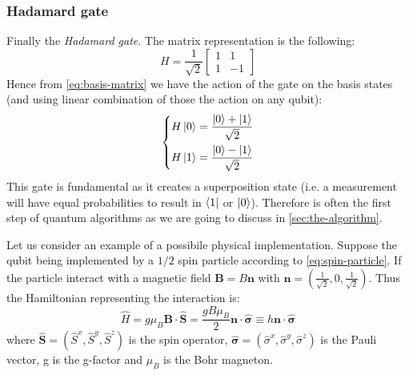 \subsubsection{Hadamard gate}
Finally the \emph{Hadamard gate}. The matrix representation is the following:
\begin{equation}\label{eq:hadamard-gate}
    H = \frac{1}{\sqrt{2}}
    \begin{bmatrix}
    1 & 1\\
    1 & -1
    \end{bmatrix}
\end{equation}
Hence from \ref{eq:basis-matrix} we have the action of the gate on the basis states (and using linear combination of those the action on any qubit):
\begin{equation}
\left\{
\begin{aligned}
    & H\ket{0} = \frac{\ket{0} + \ket{1}}{\sqrt{2}} \\
    & H\ket{1} = \frac{\ket{0} - \ket{1}}{\sqrt{2}}
\end{aligned}
\right.
\end{equation}
This gate is fundamental as it creates a superposition state (i.e. a measurement will have equal probabilities to result in $\bra{1}$ or $\ket{0}$). Therefore is often the first step of quantum algorithms as we are going to discuss in \ref{sec:the-algorithm}.

Let us consider an example of a possibile physical implementation. Suppose the qubit being implemented by a $1/2$ spin particle according to \ref{eq:spin-particle}. If the particle interact with a magnetic field $\boldsymbol{B} = B\boldsymbol{n}$ with $\boldsymbol{n} = (\frac{1}{\sqrt{2}}, 0, \frac{1}{\sqrt{2}})$. Thus the Hamiltonian representing the interaction is:
\begin{equation*}
    \hat{H} = g\mu_B \boldsymbol{B} \cdot \hat{\boldsymbol{S}} = \frac{gB\mu_B}{2} \boldsymbol{n} \cdot \hat{\boldsymbol{\sigma}} \equiv h \boldsymbol{n} \cdot \hat{\boldsymbol{\sigma}}
\end{equation*}
where $\hat{\boldsymbol{S}} = (\hat{S}^x, \hat{S}^y, \hat{S}^z)$ is the spin operator, $\hat{\boldsymbol{\sigma}} = (\hat{\sigma}^x, \hat{\sigma}^y, \hat{\sigma}^z)$ is the Pauli vector, g is the g-factor and $\mu_B$ is the Bohr magneton.

